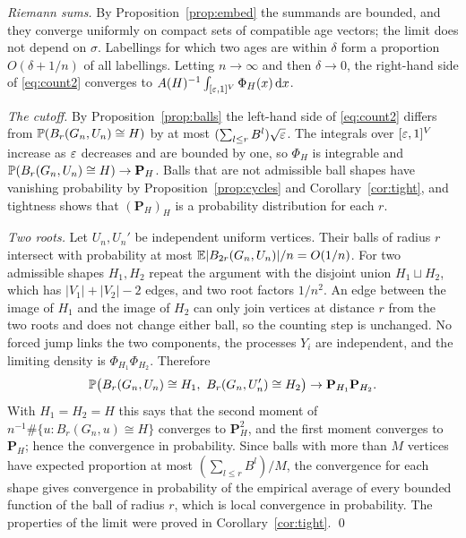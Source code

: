 \emph{Riemann sums.} By Proposition~\ref{prop:embed} the summands are bounded, and they converge uniformly on
compact sets of compatible age vectors; the limit does not depend on $\sigma$. Labellings for which two ages are
within $\delta$ form a proportion $O(\delta+1/n)$ of all labellings. Letting $n\to\infty$ and then $\delta\to0$,
the right-hand side of \eqref{eq:count2} converges to $A(H)^{-1}\int_{[\varepsilon,1]^V}\Phi_H(x)\,\mathrm dx$.

\emph{The cutoff.} By Proposition~\ref{prop:balls} the left-hand side of \eqref{eq:count2} differs from
$\mathbb{P}(B_r(G_n,U_n)\cong H)$ by at most $(\sum_{l\le r}B^l)\sqrt{\varepsilon}$. The integrals over $[\varepsilon,1]^V$ increase as
$\varepsilon$ decreases and are bounded by one, so $\Phi_H$ is integrable and
$\mathbb{P}(B_r(G_n,U_n)\cong H)\to\mathbf P_H$. Balls that are not admissible ball shapes have vanishing probability
by Proposition~\ref{prop:cycles} and Corollary~\ref{cor:tight}, and tightness shows that $(\mathbf P_H)_H$ is a
probability distribution for each $r$.

\emph{Two roots.} Let $U_n,U_n'$ be independent uniform vertices. Their balls of radius $r$ intersect with
probability at most $\mathbb{E}|B_{2r}(G_n,U_n)|/n=O(1/n)$. For two admissible shapes $H_1,H_2$ repeat the argument with
the disjoint union $H_1\sqcup H_2$, which has $|V_1|+|V_2|-2$ edges, and two root factors $1/n^2$. An edge
between the image of $H_1$ and the image of $H_2$ can only join vertices at distance $r$ from the two roots and
does not change either ball, so the counting step is unchanged. No forced jump links the two components, the
processes $Y_i$ are independent, and the limiting density is $\Phi_{H_1}\Phi_{H_2}$. Therefore
\[
   \mathbb{P}\bigl(B_r(G_n,U_n)\cong H_1,\ B_r(G_n,U_n')\cong H_2\bigr)\to\mathbf P_{H_1}\mathbf P_{H_2}.
\]
With $H_1=H_2=H$ this says that the second moment of $n^{-1}\#\{u:B_r(G_n,u)\cong H\}$ converges to
$\mathbf P_H^2$, and the first moment converges to $\mathbf P_H$; hence the convergence in probability. Since
balls with more than $M$ vertices have expected proportion at most $(\sum_{l\le r}B^l)/M$, the convergence for
each shape gives convergence in probability of the empirical average of every bounded function of the ball of
radius $r$, which is local convergence in probability. The properties of the limit were proved in
Corollary~\ref{cor:tight}. \qed
